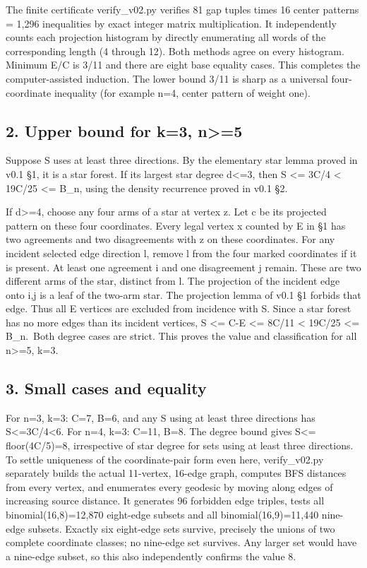 \documentclass[
  10pt,
]{article}
\begin{document}
The finite certificate verify\_v02.py verifies 81 gap tuples times 16
center patterns = 1,296 inequalities by exact integer matrix
multiplication. It independently counts each projection histogram by
directly enumerating all words of the corresponding length (4 through
12). Both methods agree on every histogram. Minimum E/C is 3/11 and
there are eight base equality cases. This completes the
computer-assisted induction. The lower bound 3/11 is sharp as a
universal four-coordinate inequality (for example n=4, center pattern of
weight one).

\subsection{2. Upper bound for k=3,
n\textgreater=5}\label{upper-bound-for-k3-n5}

Suppose S uses at least three directions. By the elementary star lemma
proved in v0.1 §1, it is a star forest. If its largest star degree
d\textless=3, then \textbar S\textbar{} \textless= 3C/4 \textless{}
19C/25 \textless= B\_n, using the density recurrence proved in v0.1 §2.

If d\textgreater=4, choose any four arms of a star at vertex z. Let c be
its projected pattern on these four coordinates. Every legal vertex x
counted by E in §1 has two agreements and two disagreements with z on
these coordinates. For any incident selected edge direction l, remove l
from the four marked coordinates if it is present. At least one
agreement i and one disagreement j remain. These are two different arms
of the star, distinct from l. The projection of the incident edge onto
i,j is a leaf of the two-arm star. The projection lemma of v0.1 §1
forbids that edge. Thus all E vertices are excluded from incidence with
S. Since a star forest has no more edges than its incident vertices,
\textbar S\textbar{} \textless= C-E \textless= 8C/11 \textless{} 19C/25
\textless= B\_n.~Both degree cases are strict. This proves the value and
classification for all n\textgreater=5, k=3.

\subsection{3. Small cases and equality}\label{small-cases-and-equality}

For n=3, k=3: C=7, B=6, and any S using at least three directions has
\textbar S\textbar\textless=3C/4\textless6. For n=4, k=3: C=11, B=8. The
degree bound gives \textbar S\textbar\textless= floor(4C/5)=8,
irrespective of star degree for sets using at least three directions. To
settle uniqueness of the coordinate-pair form even here, verify\_v02.py
separately builds the actual 11-vertex, 16-edge graph, computes BFS
distances from every vertex, and enumerates every geodesic by moving
along edges of increasing source distance. It generates 96 forbidden
edge triples, tests all binomial(16,8)=12,870 eight-edge subsets and all
binomial(16,9)=11,440 nine-edge subsets. Exactly six eight-edge sets
survive, precisely the unions of two complete coordinate classes; no
nine-edge set survives. Any larger set would have a nine-edge subset, so
this also independently confirms the value 8.
\end{document}
